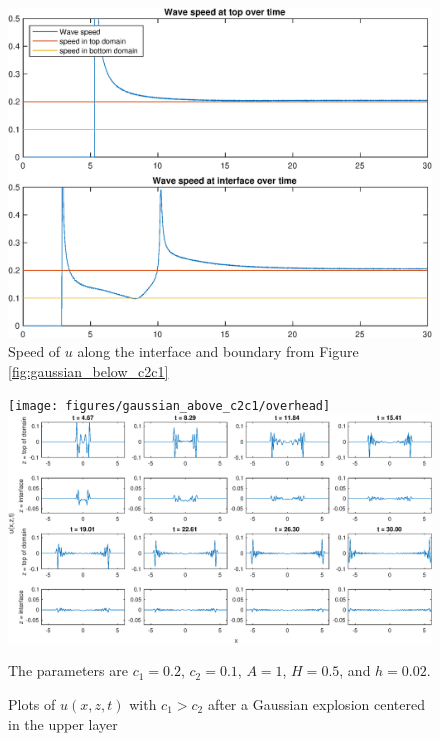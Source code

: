 \documentclass[11pt,letter,subeqn,fleqn]{article}
\numberwithin{equation}{section}
\numberwithin{table}{section}
\numberwithin{figure}{section}
\begin{document}
\begin{figure}[htbp]
	\caption{Speed of $u$ along the interface and boundary from Figure \ref{fig:gaussian_below_c2c1}}
	\label{fig:gaussian_below_c2c1_speed}
	\includegraphics[width=\linewidth]{figures/gaussian_below_c2c1/wavespeeds}
\footnotesize
\centering

\end{figure}


\begin{figure}[htbp]
	\caption{Plots of $u(x,z,t)$ with $c_1>c_2$ after a Gaussian explosion centered in the upper layer}
	\label{fig:gaussian_above_c2c1}
	\texttt{[image: figures/gaussian\_above\_c2c1/overhead]}
	\includegraphics[width=\linewidth]{figures/gaussian_above_c2c1/u_inter_boundary}
\footnotesize
\centering

The parameters are $c_1 = 0.2$, $c_2 = 0.1$, $A=1$, $H=0.5$, and $h = 0.02$.
\end{figure}
\end{document}
